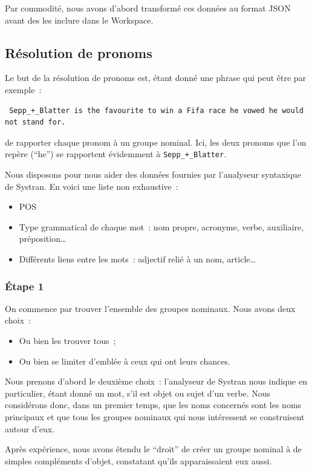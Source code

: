 \documentclass[a4paper, 12pt]{article}
\begin{document}
Par commodité, nous avons d'abord transformé ces données au format JSON avant des les inclure dans le Workspace.

\subsection{Résolution de pronoms}

Le but de la résolution de pronoms est, étant donné une phrase qui peut être par exemple~:

\begin{verbatim}
 Sepp_+_Blatter is the favourite to win a Fifa race he vowed he would not stand for.
\end{verbatim}
de rapporter chaque pronom à un groupe nominal. Ici, les deux pronoms que l'on repère (``he'') se rapportent évidemment à \verb|Sepp_+_Blatter|.

Nous disposons pour nous aider des données fournies par l'analyseur syntaxique de Systran. En voici une liste non exhaustive~:
\begin{itemize}
 \item POS
 \item Type grammatical de chaque mot~: nom propre, acronyme, verbe, auxiliaire, préposition\ldots{}
 \item Différents liens entre les mots~: adjectif relié à un nom, article\ldots{}
\end{itemize}


\subsubsection{Étape 1}
On commence par trouver l'ensemble des groupes nominaux. Nous avons deux choix~:
\begin{itemize}
 \item Ou bien les trouver tous~;
 \item Ou bien se limiter d'emblée à ceux qui ont leurs chances.
\end{itemize}

Nous prenons d'abord le deuxième choix~: l'analyseur de Systran nous indique en particulier, étant donné un mot, s'il est objet ou sujet d'un verbe. Nous considérons donc, dans un premier temps, que les noms concernés sont les noms principaux et que tous les groupes nominaux qui nous intéressent se construisent autour d'eux.

Après expérience, nous avons étendu le ``droit'' de créer un groupe nominal à de simples compléments d'objet, constatant qu'ils apparaissaient eux aussi.
\end{document}
